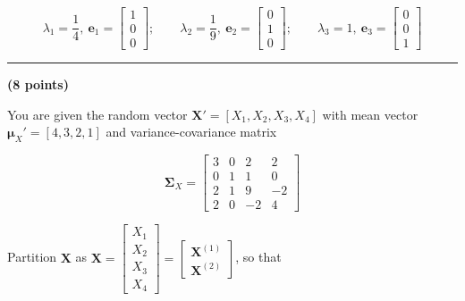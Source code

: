 \documentclass[12pt]{article}
\begin{document}
\begin{enumerate}
$$
\boxed{
\lambda_1= \frac{1}{4},\ \mathbf{e}_1 = \begin{bmatrix} 1 \\ 0 \\ 0 \end{bmatrix}; \qquad
\lambda_2 = \frac{1}{9},\ \mathbf{e}_2 = \begin{bmatrix} 0 \\ 1 \\ 0 \end{bmatrix}; \qquad
\lambda_3 = 1,\ \mathbf{e}_3 = \begin{bmatrix} 0 \\ 0 \\ 1 \end{bmatrix}
}
$$

\end{enumerate}

\vspace{2em}

\noindent\rule{\textwidth}{0.4pt}

\vspace{2em}

 \hfill {\large \textbf{(8 points)}}

\vspace{1em}

\noindent You are given the random vector $\mathbf{X}' = [X_1, X_2, X_3, X_4]$ with mean vector $\boldsymbol{\mu}_X' = [4, 3, 2, 1]$ and variance-covariance matrix

$$
\boldsymbol{\Sigma}_X =
\begin{bmatrix}
3 & 0 & 2 & 2 \\
0 & 1 & 1 & 0 \\
2 & 1 & 9 & -2 \\
2 & 0 & -2 & 4
\end{bmatrix}
$$

\noindent Partition $\mathbf{X}$ as $\mathbf{X} = \begin{bmatrix} X_1 \\ X_2 \\ X_3 \\ X_4 \end{bmatrix} = \begin{bmatrix} \mathbf{X}^{(1)} \\ \mathbf{X}^{(2)} \end{bmatrix}$, so that
\end{document}
